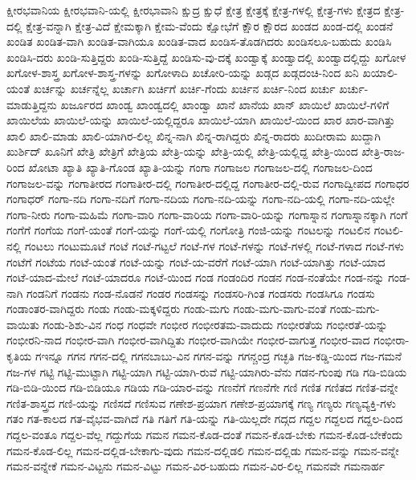 {ಕ್ಷೀರಭವಾನಿಯ
ಕ್ಷೀರಭವಾನಿ-ಯಲ್ಲಿ
ಕ್ಷೀರಭಾವಾನಿ
ಕ್ಷುದ್ರ
ಕ್ಷುಧೆ
ಕ್ಷೇತ್ರ
ಕ್ಷೇತ್ರಕ್ಕೆ
ಕ್ಷೇತ್ರ-ಗಳಲ್ಲಿ
ಕ್ಷೇತ್ರ-ಗಳು
ಕ್ಷೇತ್ರದ
ಕ್ಷೇತ್ರ-ದಲ್ಲಿ
ಕ್ಷೇತ್ರ-ವನ್ನಾಗಿ
ಕ್ಷೇತ್ರ-ವಿದೆ
ಕ್ಷೇಮಕ್ಕಾಗಿ
ಕ್ಷೇಮ-ವೆಂದು
ಕ್ಷೋಭೆಗೆ
ಕ್ಷೌರ
ಕ್ಷೌರದ
ಖಂಡದ
ಖಂಡ-ದಲ್ಲಿ
ಖಂಡನೆ
ಖಂಡಿತ
ಖಂಡಿತ-ವಾಗಿ
ಖಂಡಿತ-ವಾಗಿಯೂ
ಖಂಡಿತ-ವಾದ
ಖಂಡಿಸ-ತೊಡಗಿದರು
ಖಂಡಿಸಲೂ-ಬಹುದು
ಖಂಡಿಸಿ
ಖಂಡಿಸಿ-ದರು
ಖಂಡಿ-ಸುತ್ತಿದ್ದರು
ಖಂಡಿ-ಸುತ್ತಿದ್ದೆ
ಖಂಡಿಸು-ವು-ದಕ್ಕೆ
ಖಂಡ್ವಾಕ್ಕೆ
ಖಂಡ್ವಾದಲ್ಲಿ
ಖಂಡ್ವಾದಲ್ಲಿದ್ದು
ಖಗೋಳ
ಖಗೋಳ-ಶಾಸ್ತ್ರ
ಖಗೋಳ-ಶಾಸ್ತ್ರ-ಗಳನ್ನು
ಖಗೋಳಾದಿ
ಖಚೋರಿ-ಯನ್ನು
ಖಡ್ಗದ
ಖಡ್ಗದಂಚಿ-ನಿಂದ
ಖನಿ
ಖಯಾಲಿ-ಯಂತೆ
ಖರ್ಚನ್ನು
ಖರ್ಚನ್ನೆಲ್ಲ
ಖರ್ಚಾಗಿ
ಖರ್ಚಿಗೆ
ಖರ್ಚಿ-ಗೆಂದು
ಖರ್ಚಿನ
ಖರ್ಚಿ-ನಿಂದ
ಖರ್ಚು
ಖರ್ಚು-ಮಾಡುತ್ತಿದ್ದನು
ಖರ್ಜೂರದ
ಖಾಂಡ್ವ
ಖಾಂಡ್ವದಲ್ಲಿ
ಖಾಂಡ್ವಾ
ಖಾನೆ
ಖಾನೆಯ
ಖಾನ್
ಖಾಯಿಲೆ
ಖಾಯಿಲೆ-ಗಳಿಗೆ
ಖಾಯಿಲೆಯ
ಖಾಯಿಲೆ-ಯನ್ನು
ಖಾಯಿಲೆ-ಯಲ್ಲಿದ್ದರೂ
ಖಾಯಿಲೆ-ಯಾಗಿ
ಖಾಯಿಲೆ-ಯಿಂದ
ಖಾರ
ಖಾರ-ವಾಗಿತ್ತು
ಖಾಲಿ
ಖಾಲಿ-ಮಾಡು
ಖಾಲಿ-ಯಾಗಿರ-ಲಿಲ್ಲ
ಖಿನ್ನ-ನಾಗಿ
ಖಿನ್ನ-ರಾಗಿದ್ದರು
ಖಿನ್ನ-ರಾದರು
ಖುದೀರಾಮ
ಖುದ್ದಾಗಿ
ಖುರ್ಶಿದ್
ಖೂನಿಗೆ
ಖೇತ್ರಿ
ಖೇತ್ರಿಗೆ
ಖೇತ್ರಿಯ
ಖೇತ್ರಿ-ಯನ್ನು
ಖೇತ್ರಿ-ಯಲ್ಲಿ
ಖೇತ್ರಿ-ಯಲ್ಲಿದ್ದ
ಖೇತ್ರಿ-ಯಿಂದ
ಖೇತ್ರಿ-ರಾಜ-ರಿಂದ
ಖೋಟಾ
ಖ್ಯಾತಿ
ಖ್ಯಾತಿ-ಗೊಂಡ
ಖ್ಯಾತಿ-ಯನ್ನು
ಗಂಗಾ
ಗಂಗಾಜಲ
ಗಂಗಾಜಲ-ದಲ್ಲಿ
ಗಂಗಾಜಲ-ದಿಂದ
ಗಂಗಾಜಲ-ವನ್ನು
ಗಂಗಾತೀರದ
ಗಂಗಾತೀರ-ದಲ್ಲಿ
ಗಂಗಾತೀರ-ದಲ್ಲಿದ್ದ
ಗಂಗಾತೀರ-ದಲ್ಲಿ-ರುವ
ಗಂಗಾದ್ವೀಪದ
ಗಂಗಾಧರ
ಗಂಗಾಧರ್
ಗಂಗಾ-ನದಿ
ಗಂಗಾ-ನದಿಗೆ
ಗಂಗಾ-ನದಿಯ
ಗಂಗಾ-ನದಿ-ಯನ್ನು
ಗಂಗಾ-ನದಿ-ಯಲ್ಲಿ
ಗಂಗಾ-ನದಿ-ಯಲ್ಲೇ
ಗಂಗಾ-ನೀರು
ಗಂಗಾ-ಮಹಿಮೆ
ಗಂಗಾ-ವಾರಿ
ಗಂಗಾ-ವಾರಿಯ
ಗಂಗಾ-ವಾರಿ-ಯನ್ನು
ಗಂಗಾಸ್ನಾನ
ಗಂಗಾಸ್ನಾನಕ್ಕಾಗಿ
ಗಂಗೆ
ಗಂಗೆಗೆ
ಗಂಗೆಯ
ಗಂಗೆ-ಯಂತೆ
ಗಂಗೆ-ಯನ್ನು
ಗಂಗೆ-ಯಲ್ಲಿ
ಗಂಗೋತ್ರಿ
ಗಂಜಿ-ಯನ್ನು
ಗಂಟಲನ್ನು
ಗಂಟಲಿನ
ಗಂಟಲಿ-ನಲ್ಲಿ
ಗಂಟಲು
ಗಂಟುಮೂಟೆ
ಗಂಟೆ
ಗಂಟೆ-ಗಟ್ಟಲೆ
ಗಂಟೆ-ಗಳ
ಗಂಟೆ-ಗಳನ್ನು
ಗಂಟೆ-ಗಳಲ್ಲಿ
ಗಂಟೆ-ಗಳಾದ
ಗಂಟೆ-ಗಳು
ಗಂಟೆಗೆ
ಗಂಟೆಯ
ಗಂಟೆ-ಯಂತೆ
ಗಂಟೆ-ಯನ್ನು
ಗಂಟೆ-ಯ-ವರೆಗೆ
ಗಂಟೆ-ಯಾಗಿ
ಗಂಟೆ-ಯಾಗಿತ್ತು
ಗಂಟೆ-ಯಾದ
ಗಂಟೆ-ಯಾದ-ಮೇಲೆ
ಗಂಟೆ-ಯಾದರೂ
ಗಂಟೆ-ಯಿಂದ
ಗಂಡ
ಗಂಡಂದಿರ
ಗಂಡನ
ಗಂಡ-ನಂತೆಯೇ
ಗಂಡ-ನನ್ನು
ಗಂಡ-ನಾಗಿ
ಗಂಡನಿಗೆ
ಗಂಡನು
ಗಂಡ-ನೊಡನೆ
ಗಂಡರ
ಗಂಡಸನ್ನು
ಗಂಡಸರಿ-ಗಿಂತ
ಗಂಡಸರು
ಗಂಡಸಿಗೂ
ಗಂಡಸು
ಗಂಡಾಂತರ-ವಾಗಿದ್ದರು
ಗಂಡು
ಗಂಡು-ಮಕ್ಕಳಿದ್ದರು
ಗಂಡು-ಮಗು
ಗಂಡು-ಮಗು-ವಾಗು-ವಂತೆ
ಗಂಡು-ಮಗು-ವಾಯಿತು
ಗಂಡು-ಶಿಶು-ವಿನ
ಗಂಧ
ಗಂಧವೇ
ಗಂಭೀರ
ಗಂಭೀರತಮ-ವಾದುದು
ಗಂಭೀರತೆಯ
ಗಂಭೀರತೆ-ಯನ್ನು
ಗಂಭೀರನಿ-ನಾದ
ಗಂಭೀರ-ವಾಗಿ
ಗಂಭೀರ-ವಾಗಿದ್ದಿತು
ಗಂಭೀರ-ವಾಗಿಯೇ
ಗಂಭೀರ-ವಾಗುತ್ತ
ಗಂಭೀರ-ವಾದ
ಗಂಭೀರಾ-ಕೃತಿಯ
ಗಇನ್ನೂ
ಗಗನ
ಗಗನ-ದಲ್ಲಿ
ಗಗನಬಾಬು-ವಿನ
ಗಗನ-ವನ್ನು
ಗಗನ್ಚಂದ್ರ
ಗಚ್ಛತಿ
ಗಜ-ಕಡ್ಡಿ-ಯಿಂದ
ಗಜ-ಗಮನೆ
ಗಜ-ಗಳ
ಗಟ್ಟಿ
ಗಟ್ಟಿ-ಮುಟ್ಟಾಗಿ
ಗಟ್ಟಿ-ಯಾಗಿ
ಗಟ್ಟಿ-ಯಾಗಿ-ರುವೆ
ಗಟ್ಟಿ-ಯಾಗಿರು-ವೆನು
ಗಡನ-ಗುಂಪು
ಗಡಿ
ಗಡಿ-ಬಿಡಿಯ
ಗಡಿ-ಬಿಡಿ-ಯಿಂದ
ಗಡಿ-ಬಿಡಿಯೂ
ಗಡಿಯ
ಗಡಿ-ಯಾರ-ವನ್ನು
ಗಣನೆಗೆ
ಗಣನೆಗೇ
ಗಣಿ
ಗಣಿತ
ಗಣಿತದ
ಗಣಿತ-ವನ್ನೇ
ಗಣಿತ-ಶಾಸ್ತ್ರದ
ಗಣಿ-ಯನ್ನು
ಗಣಿಸದೆ
ಗಣಿಸುವ
ಗಣೇಶ-ಪ್ರಯಾಗ
ಗಣೇಶ-ಪ್ರಯಾಗಕ್ಕೆ
ಗಣ್ಯ
ಗಣ್ಯರು
ಗಣ್ಯವ್ಯಕ್ತಿ-ಗಳು
ಗತಂ
ಗತ-ಕಾಲದ
ಗತ-ವೈಭವ-ವಾಗಿದೆ
ಗತಿ
ಗತಿಗೆ
ಗತಿ-ಯನ್ನು
ಗತಿ-ಯಿಲ್ಲದೇ
ಗದ್ಗದ
ಗದ್ದಲ
ಗದ್ದಲದ
ಗದ್ದಲ-ದಿಂದ
ಗದ್ದಲ-ವಂತೂ
ಗದ್ದಲ-ವೆಲ್ಲ
ಗದ್ದುಗೆಯ
ಗಮನ
ಗಮನ-ಕೊಡ-ದಂತೆ
ಗಮನ-ಕೊಡ-ಬೇಕು
ಗಮನ-ಕೊಡ-ಬೇಕೆಂದು
ಗಮನ-ಕೊಡ-ಲಿಲ್ಲ
ಗಮನ-ದಲ್ಲಿಡ-ಬೇಕಾಗು-ವುದು
ಗಮನ-ದಲ್ಲಿಡಲಿ
ಗಮನ-ದಲ್ಲಿಡು
ಗಮನ-ವನ್ನು
ಗಮನ-ವನ್ನೇ
ಗಮನ-ವನ್ನೇಕೆ
ಗಮನ-ವಿಟ್ಟನು
ಗಮನ-ವಿಟ್ಟು
ಗಮನ-ವಿರ-ಬಹುದು
ಗಮನ-ವಿರ-ಲಿಲ್ಲ
ಗಮನವೇ
ಗಮನಾರ್ಹ
}
